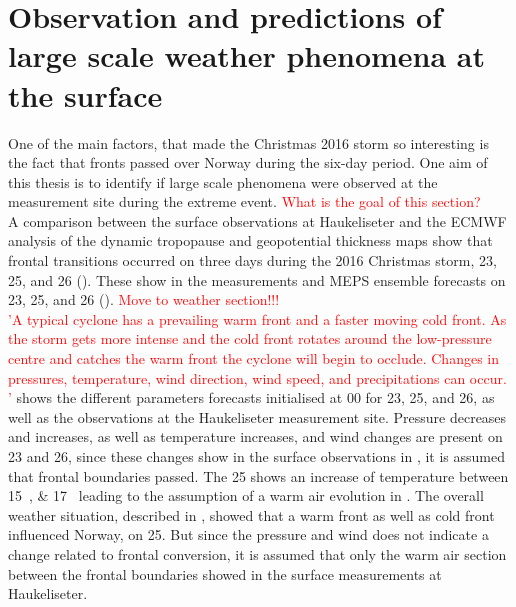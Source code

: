 \section{Observation and predictions of large scale weather phenomena at the surface}\label{sec:res:large_scale_sfc}
One of the main factors, that made the Christmas 2016 storm so interesting is the fact that fronts passed over Norway during the six-day period. One aim of this thesis is to identify if large scale phenomena were observed at the measurement site during the extreme event. 
\textcolor{red}{What is the goal of this section?}
\\
A comparison between the surface observations at Haukeliseter and the ECMWF analysis of the dynamic tropopause and geopotential thickness maps show that frontal transitions occurred on three days during the 2016 Christmas storm, \num{23}, \num{25}, and \SI{26}{\dec} ().  
These show in the measurements and MEPS ensemble forecasts on \num{23}, \num{25}, and \SI{26}{\dec} (). 
\textcolor{red}{Move to weather section!!! 
	\\ 'A typical cyclone has a prevailing warm front and a faster moving cold front. As the storm gets more intense and the cold front rotates around the low-pressure centre and catches the warm front the cyclone will begin to occlude. Changes in pressures, temperature, wind direction, wind speed, and precipitations can occur. '}
 shows the different parameters forecasts initialised at \SI{00}{\UTC} for \num{23}, \num{25}, and \SI{26}{\dec}, as well as the observations at the Haukeliseter measurement site.
Pressure decreases and increases, as well as temperature increases, and wind changes are present on \num{23} and \SI{26}{\dec}, since these changes show in the surface observations in , it is assumed that frontal boundaries passed. The \SI{25}{\dec} shows an increase of temperature between \SIlist{15;17}{\UTC} leading to the assumption of a warm air evolution in . The overall weather situation, described in , showed that a warm front as well as cold front influenced Norway, on \SI{25}{\dec}. But since the pressure and wind does not indicate a change related to frontal conversion, it is assumed that only the warm air section between the frontal boundaries showed in the surface measurements at Haukeliseter.   
